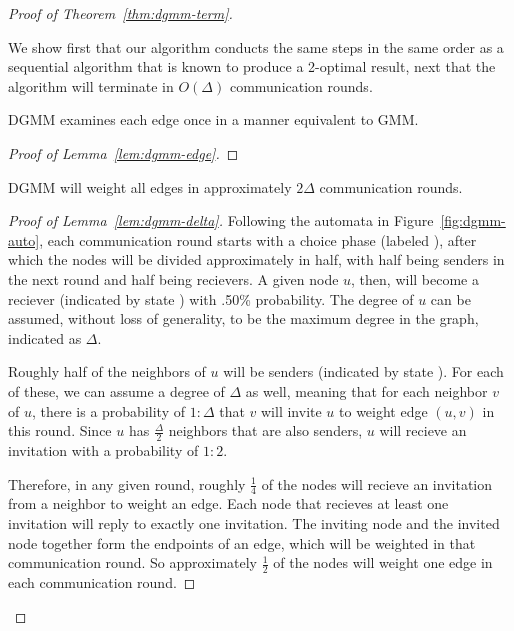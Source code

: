 \begin{proof}[Proof of Theorem~\ref{thm:dgmm-term}]
\label{prf:correct}
\begin{smy}
We show first that our algorithm conducts the same steps in the same order as a sequential algorithm that is known to produce a 2-optimal result, next that the algorithm will terminate in $O(\Delta)$ communication rounds.
\end{smy} 

\begin{lem}
\label{lem:dgmm-edge}
  DGMM examines each edge once in a manner equivalent to GMM.
\end{lem}
\begin{proof}[Proof of Lemma~\ref{lem:dgmm-edge}]

\end{proof}

\begin{lem}
  \label{lem:dgmm-delta}
  DGMM will weight all edges in approximately $2\Delta$ communication rounds.
\end{lem}
\begin{proof}[Proof of Lemma~\ref{lem:dgmm-delta}]

Following the automata in Figure~\ref{fig:dgmm-auto}, each communication round starts with a choice phase (labeled \cCd), after which the nodes will be divided approximately in half, with half being senders in the next round and half being recievers. A given node $u$, then, will become a reciever (indicated by state \cLd) with .50\% probability. The degree of $u$ can be assumed, without loss of generality, to be the maximum degree in the graph, indicated as $\Delta$. 

Roughly half of the neighbors of $u$ will be senders (indicated by state \cId). For each of these, we can assume a degree of $\Delta$ as well, meaning that for each neighbor $v$ of $u$, there is a probability of $1:\Delta$ that $v$ will invite $u$ to weight edge $(u,v)$ in this round. Since $u$ has $\frac{\Delta}{2}$ neighbors that are also senders, $u$ will recieve an invitation with a probability of $1:2$. 

Therefore, in any given round, roughly $\frac{1}{4}$ of the nodes will recieve an invitation from a neighbor to weight an edge. Each node that recieves at least one invitation will reply to exactly one invitation. The inviting node and the invited node together form the endpoints of an edge, which will be weighted in that communication round. So approximately $\frac{1}{2}$ of the nodes will weight one edge in each communication round.


\end{proof}
\end{proof}
